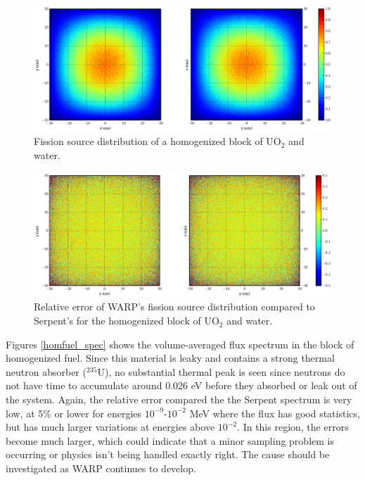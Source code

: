\begin{figure}[h!]
\centering
\includegraphics[width=\textwidth,trim= 5cm 0cm 7cm 0cm]{graphics/finalresults/homfuel_fiss-6.eps}
\caption{Fission source distribution of a homogenized block of UO$_2$ and water. \label{homfuel_fiss} }
\end{figure}

\begin{figure}[h!]
\centering
\includegraphics[width=\textwidth,trim= 5cm 0cm 7cm 0cm]{graphics/finalresults/homfuel_fiss_diff-6.eps}
\caption{Relative error of WARP's fission source distribution compared to Serpent's for the homogenized block of UO$_2$ and water. \label{homfuel_fiss_diff} }
\end{figure}

Figures \ref{homfuel_spec} shows the volume-averaged flux spectrum in the block of homogenized fuel.   Since this material is leaky and contains a strong thermal neutron absorber ($^{235}$U), no substantial thermal peak is seen since neutrons do not have time to accumulate around 0.026 eV before they absorbed or leak out of the system.   Again, the relative error compared the the Serpent spectrum is very low, at 5\% or lower for energies $10^{-9}$-$10^{-2}$ MeV where the flux has good statistics, but has much larger variations at energies above $10^{-2}$.  In this region, the errors become much larger, which could indicate that a minor sampling problem is occurring or physics isn't being handled exactly right.  The cause should be investigated as WARP continues to develop.  

